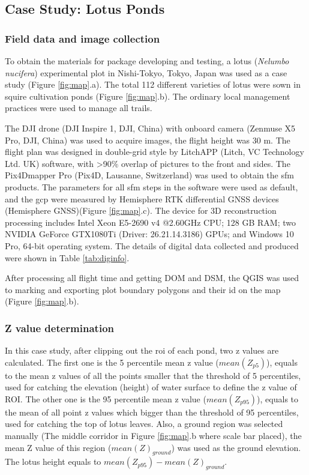 \documentclass[doublespacing]{configs/bmcart}
\begin{document}
\subsection*{Case Study: Lotus Ponds}

\subsubsection*{Field data and image collection}
To obtain the materials for package developing and testing, a lotus (\textit{Nelumbo nucifera}) experimental plot in Nishi-Tokyo, Tokyo, Japan was used as a case study (Figure \ref{fig:map}.a). The total 112 different varieties of lotus were sown in squire cultivation ponds (Figure \ref{fig:map}.b). The ordinary local management practices were used to manage all trails.

The DJI drone (DJI Inspire 1, DJI, China) with onboard camera (Zenmuse X5 Pro, DJI, China) was used to acquire images, the flight height was 30 m. The flight plan was designed in double-grid style by LitchAPP (Litch, VC Technology Ltd. UK) software, with >90\% overlap of pictures to the front and sides. The Pix4Dmapper Pro (Pix4D, Lausanne, Switzerland) was used to obtain the \acrshort*{sfm} products. The parameters for all \acrshort*{sfm} steps in the software were used as default, and the \acrshort*{gcp} were measured by Hemisphere RTK differential GNSS devices (Hemisphere GNSS)(Figure \ref{fig:map}.c). The device for 3D reconstruction processing includes Intel Xeon E5-2690 v4 @2.60GHz CPU; 128 GB RAM; two NVIDIA GeForce GTX1080Ti (Driver: 26.21.14.3186) GPUs; and Windows 10 Pro, 64-bit operating system. The details of digital data collected and produced were shown in Table \ref{tab:diginfo}.

After processing all flight time and getting DOM and DSM, the QGIS was used to marking and exporting plot boundary polygons and their id on the map (Figure \ref{fig:map}.b).

\subsubsection*{Z value determination}
In this case study, after clipping out the \acrshort*{roi} of each pond, two z values are calculated. The first one is the 5 percentile mean z value ($mean(Z_{p5})$), equals to the mean z values of all the points smaller that the threshold of 5 percentiles, used for catching the elevation (height) of water surface to define the z value of ROI. The other one is the 95 percentile mean z value ($mean(Z_{p95})$), equals to the mean of all point z values which bigger than the threshold of 95 percentiles, used for catching the top of lotus leaves. Also, a ground region was selected manually (The middle corridor in Figure \ref{fig:map}.b where scale bar placed), the mean Z value of this region ($mean(Z)_{ground}$) was used as the ground elevation. The lotus height equals to $mean(Z_{p95}) - mean(Z)_{ground}$.
\end{document}
